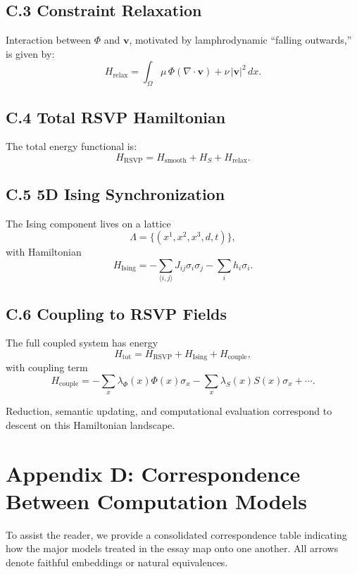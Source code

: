 \documentclass[12pt,letterpaper]{article}
\begin{document}
\subsection*{C.3 Constraint Relaxation}
Interaction between $\Phi$ and $\mathbf{v}$, motivated by lamphrodynamic
``falling outwards,'' is given by:
\[
H_{\text{relax}}
=
\int_{\Omega}
\mu\,\Phi(\nabla\cdot\mathbf{v})
+ \nu\,|\mathbf{v}|^2
\,dx.
\]

\subsection*{C.4 Total RSVP Hamiltonian}
The total energy functional is:
\[
H_{\text{RSVP}}
=
H_{\text{smooth}}
+ H_S
+ H_{\text{relax}}.
\]

\subsection*{C.5 5D Ising Synchronization}
The Ising component lives on a lattice
\[
\Lambda = \{(x^1,x^2,x^3,d,t)\},
\]
with Hamiltonian
\[
H_{\text{Ising}}
=
-\sum_{\langle i,j\rangle} J_{ij}\sigma_i\sigma_j
- \sum_i h_i \sigma_i.
\]

\subsection*{C.6 Coupling to RSVP Fields}
The full coupled system has energy
\[
H_{\text{tot}}
=
H_{\text{RSVP}}
+ H_{\text{Ising}}
+ H_{\text{couple}},
\]
with coupling term
\[
H_{\text{couple}}
=
-\sum_{x}\lambda_\Phi(x)\Phi(x)\sigma_x
-\sum_{x}\lambda_S(x)S(x)\sigma_x
+ \cdots.
\]

Reduction, semantic updating, and computational evaluation correspond to
descent on this Hamiltonian landscape.


\section{Appendix D: Correspondence Between Computation Models}

To assist the reader, we provide a consolidated correspondence table indicating
how the major models treated in the essay map onto one another.  
All arrows denote faithful embeddings or natural equivalences.
\end{document}
